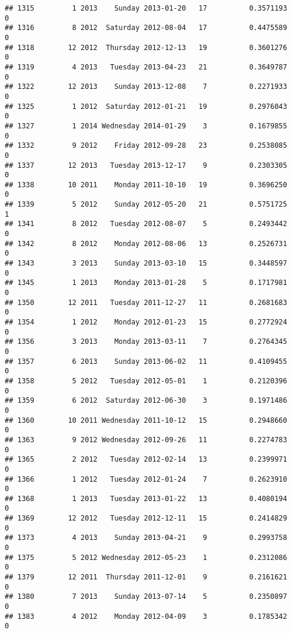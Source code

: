 \documentclass[
]{article}
\begin{document}
\begin{verbatim}
## 1315         1 2013    Sunday 2013-01-20   17          0.3571193             0
## 1316         8 2012  Saturday 2012-08-04   17          0.4475589             0
## 1318        12 2012  Thursday 2012-12-13   19          0.3601276             0
## 1319         4 2013   Tuesday 2013-04-23   21          0.3649787             0
## 1322        12 2013    Sunday 2013-12-08    7          0.2271933             0
## 1325         1 2012  Saturday 2012-01-21   19          0.2976043             0
## 1327         1 2014 Wednesday 2014-01-29    3          0.1679855             0
## 1332         9 2012    Friday 2012-09-28   23          0.2538085             0
## 1337        12 2013   Tuesday 2013-12-17    9          0.2303305             0
## 1338        10 2011    Monday 2011-10-10   19          0.3696250             0
## 1339         5 2012    Sunday 2012-05-20   21          0.5751725             1
## 1341         8 2012   Tuesday 2012-08-07    5          0.2493442             0
## 1342         8 2012    Monday 2012-08-06   13          0.2526731             0
## 1343         3 2013    Sunday 2013-03-10   15          0.3448597             0
## 1345         1 2013    Monday 2013-01-28    5          0.1717981             0
## 1350        12 2011   Tuesday 2011-12-27   11          0.2681683             0
## 1354         1 2012    Monday 2012-01-23   15          0.2772924             0
## 1356         3 2013    Monday 2013-03-11    7          0.2764345             0
## 1357         6 2013    Sunday 2013-06-02   11          0.4109455             0
## 1358         5 2012   Tuesday 2012-05-01    1          0.2120396             0
## 1359         6 2012  Saturday 2012-06-30    3          0.1971486             0
## 1360        10 2011 Wednesday 2011-10-12   15          0.2948660             0
## 1363         9 2012 Wednesday 2012-09-26   11          0.2274783             0
## 1365         2 2012   Tuesday 2012-02-14   13          0.2399971             0
## 1366         1 2012   Tuesday 2012-01-24    7          0.2623910             0
## 1368         1 2013   Tuesday 2013-01-22   13          0.4080194             0
## 1369        12 2012   Tuesday 2012-12-11   15          0.2414829             0
## 1373         4 2013    Sunday 2013-04-21    9          0.2993758             0
## 1375         5 2012 Wednesday 2012-05-23    1          0.2312086             0
## 1379        12 2011  Thursday 2011-12-01    9          0.2161621             0
## 1380         7 2013    Sunday 2013-07-14    5          0.2350897             0
## 1383         4 2012    Monday 2012-04-09    3          0.1785342             0

\end{verbatim}
\end{document}
